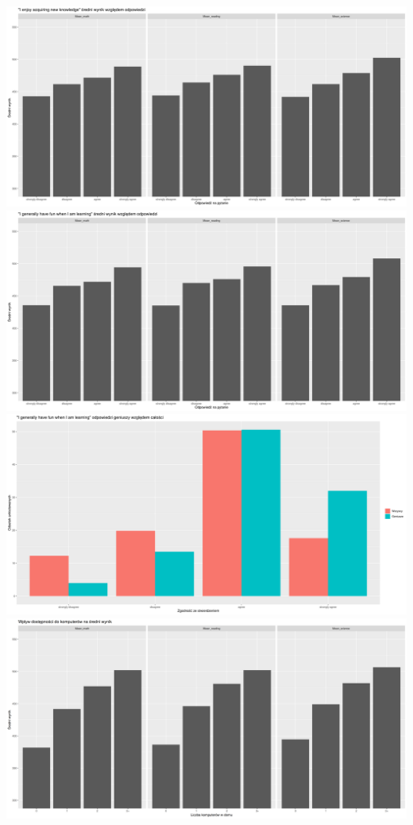 \documentclass[]{article}
\begin{document}
\includegraphics[width=1\linewidth]{./wykresy_pytania_kwestionariusz/enjoy_new_knowledge}
\includegraphics[width=1\linewidth]{./wykresy_pytania_kwestionariusz/have_fun_learning}
\includegraphics[width=1\linewidth]{./wykresy_pytania_kwestionariusz/have_fun_odsetek}
\includegraphics[width=1\linewidth]{./wykresy_pytania_kwestionariusz/liczba_komputerow}
\end{document}
